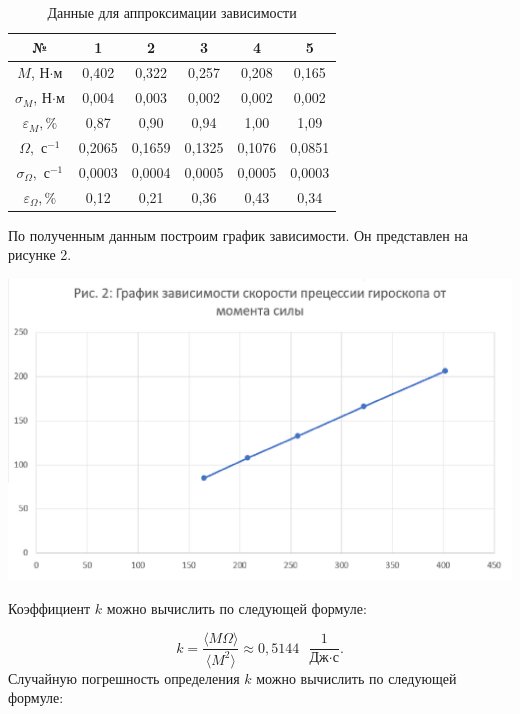 \documentclass[a4paper,12pt]{article} %
\begin{document}
\begin{table}[H]
	\centering
	\begin{tabular}{|c|c|c|c|c|c|}
		\hline
		№             & 1  & 2  & 3  & 4  & 5  \\
		\hline \hline
		$ M $, Н$\cdot$м             & 0,402  & 0,322  & 0,257  & 0,208  & 0,165  \\ \hline
		$ \sigma_M $, Н$\cdot$м       & 0,004  & 0,003  & 0,002  & 0,002  & 0,002  \\ \hline
		$ \varepsilon_M, \% $  & 0,87   & 0,90   & 0,94   & 1,00   & 1,09   \\ \hline \hline
		$ \Omega, \text{ с}^{-1} $          & 0,2065 & 0,1659 & 0,1325 & 0,1076 & 0,0851 \\ \hline
		$ \sigma_\Omega, \text{ с}^{-1} $    & 0,0003 & 0,0004 & 0,0005 & 0,0005 & 0,0003 \\ \hline
		$ \varepsilon_\Omega, \% $ & 0,12   & 0,21   & 0,36   & 0,43   & 0,34   \\ \hline
	\end{tabular}
	\caption{Данные для аппроксимации зависимости}
	\label{mnk}
\end{table}

По полученным данным построим график зависимости. Он представлен на рисунке 2.

\begin{center}

    \includegraphics[width=1\linewidth]{omega.png}\\
   
   \end{center}

Коэффициент $ k $ можно вычислить по следующей формуле:\label{k}

\begin{equation}
k = \frac{\langle M\Omega\rangle}{\langle M^2 \rangle} \approx 0,5144 \text{ } \frac{1}{\text{Дж} \cdot \text{с}}.
\end{equation}
Случайную погрешность определения $ k $ можно вычислить по следующей формуле:
\end{document}
